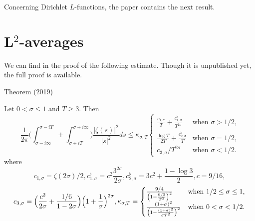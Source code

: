 Concerning Dirichlet $L$-functions, the paper
\cite{Bennett-Martin-OBryant-Rechnitzer*21}
contains the next result.






\par 
\section{L${}^2$-averages}


We can find in
\cite{Helgott*17u} the proof
of the following estimate. Though it is unpublished yet, the full proof
is available.
\begin{thm}{Theorem (2019)}

Let $0 < \sigma{}$ and $T $. Then
  $$
    \frac{1}{2\pi}\biggl(
    \int_{\sigma-i\infty}^{\sigma-iT}
    +
    \int^{\sigma+i\infty}_{\sigma+iT}
    \biggr)
    \frac{|\zeta(s)|^2}{|s|^2}ds\le
    \kappa_{\sigma,T}
    \begin{cases}
    \frac{c_{1,\sigma}}{T}+\frac{c^\flat_{1,\sigma}}{T^{2\sigma}}
    &\text{when $\sigma > 1/2$,}\\
    \frac{\log T}{2T}+\frac{c^\flat_{2,\sigma}}{T}
    &\text{when $\sigma=1/2$,}\\
    c_{3,\sigma}/T^{2\sigma}&\text{when $\sigma < 1/2$.}
    \end{cases}
  $$
 where
$$
c_{1,\sigma}=\zeta(2\sigma)/2,
 c_{1,\sigma}^\flat=c^2 \frac{3^{2\sigma}}{2\sigma},
  c_{2,\sigma}^\flat=3c^2+\frac{1-\log 3}{2},
c=9/16,						  
 $$
 $$
 c_{3,\sigma}=
\Bigl(\frac{c^2}{2\sigma}+\frac{1/6}{1-2\sigma}\Bigr)
\Bigl(1+\frac{1}{\sigma}\Bigr)^{2\sigma},
\kappa_{\sigma,T}=
\begin{cases}
\frac{9/4}{\left(1-\frac{9/2}{T^2}\right)^2}
&\text{when $1/2\le \sigma\le 1$,}\\
\frac{(1+\sigma)^2}{\left(1-\frac{(1+\sigma)^2}{\sigma T^2}\right)^2}
&\text{when $0 < \sigma < 1/2$.}
 \end{cases}
 $$
						  
\end{thm}





